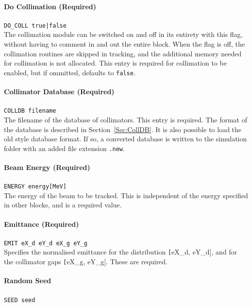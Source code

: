 \paragraph{Do Collimation (Required)} \texttt{DO\_COLL true|false}\\

The collimation module can be switched on and off in its entirety with this flag, without having to comment in and out the entire block.
When the flag is off, the collimation routines are skipped in tracking, and the additional memory needed for collimation is not allocated.
This entry is required for collimation to be enabled, but if ommitted, defaults to \texttt{false}.

\paragraph{Collimator Database (Required)} \texttt{COLLDB filename}\\

The filename of the database of collimators.
This entry is required.
The format of the database is described in Section~\ref{Sec:CollDB}.
It is also possible to load the old style database format.
If so, a converted database is written to the simulation folder with an added file extension \texttt{.new}.

\paragraph{Beam Energy (Required)} \texttt{ENERGY energy[MeV]}\\

The energy of the beam to be tracked.
This is independent of the energy specified in other blocks, and is a required value.

\paragraph{Emittance (Required)} \texttt{EMIT eX\_d eY\_d eX\_g eY\_g}\\

Specifies the normalised emittance for the distribution \texttt[eX\_d, eY\_d], and for the collimator gaps \texttt[eX\_g, eY\_g].
These are required.

\paragraph{Random Seed} \texttt{SEED seed}\\

